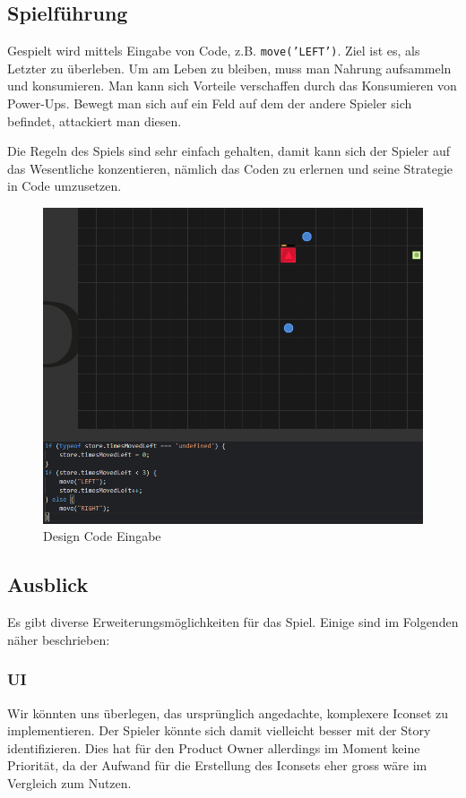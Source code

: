 \documentclass[11pt,a4paper,titlepage]{article}
\begin{document}
\subsection{Spielführung}

Gespielt wird mittels Eingabe von Code, z.B. \texttt{move('LEFT')}. Ziel ist es, als Letzter zu überleben. Um am Leben zu bleiben, muss man Nahrung aufsammeln und konsumieren. Man kann sich Vorteile verschaffen durch das Konsumieren von Power-Ups. Bewegt man sich auf ein Feld auf dem der andere Spieler sich befindet, attackiert man diesen.

Die Regeln des Spiels sind sehr einfach gehalten, damit kann sich der Spieler auf das Wesentliche konzentieren, nämlich das Coden zu erlernen und seine Strategie in Code umzusetzen.

\begin{figure}[H]
	\includegraphics[width=\textwidth]{game2.png}
	\caption{Design Code Eingabe}
\end{figure}


\subsection{Ausblick}

Es gibt diverse Erweiterungsmöglichkeiten für das Spiel. Einige sind im Folgenden näher beschrieben:

\subsubsection{UI}
Wir könnten uns überlegen, das ursprünglich angedachte, komplexere Iconset zu implementieren. Der Spieler könnte sich damit vielleicht besser mit der Story identifizieren. Dies hat für den Product Owner allerdings im Moment keine Priorität, da der Aufwand für die Erstellung des Iconsets eher gross wäre im Vergleich zum Nutzen.
\end{document}
